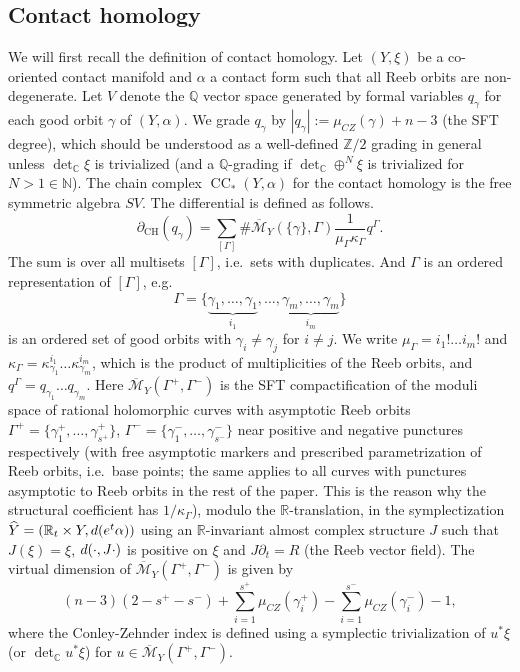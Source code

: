 \documentclass[reqno,11pt]{amsart}
\numberwithin{equation}{section}
\def\N{{\mathbb N}}
\def\R{\mathbb{R}}
\def\Z{{\mathbb Z}}
\def\C{{\mathbb C}}
\def\Q{{\mathbb Q}}
\def\cM{{\mathcal M}}
\def\rd{{\rm d}}
\DeclareMathOperator{\CH}{CH}
\DeclareMathOperator{\CC}{CC}
\begin{document}
\subsection{Contact homology}
We will first recall the definition of contact homology. Let $(Y,\xi)$ be a co-oriented contact manifold and $\alpha$ a contact form such that all Reeb orbits are non-degenerate. Let $V$ denote the $\Q$ vector space generated by formal variables $q_\gamma$ for each good orbit $\gamma$ of $(Y,\alpha)$. We grade $q_\gamma$ by $|q_{\gamma}|:=\mu_{CZ}(\gamma)+n-3$ (the SFT degree), which should be understood as a well-defined $\Z/2$ grading in general unless $\det_{\C}\xi$ is trivialized (and a $\Q$-grading if $\det_{\C}\oplus^N \xi$ is trivialized for $N>1\in \N$). The chain complex  $\CC_*(Y,\alpha)$ for the contact homology is the free symmetric algebra $SV$. The differential is defined as follows.
\begin{equation}\label{eqn:partial}
\partial_{\CH}(q_{\gamma}) = \sum_{[\Gamma]} \#\overline{\cM}_{Y}(\{\gamma \},\Gamma) \frac{1}{\mu_{\Gamma}\kappa_{\Gamma}}q^{\Gamma}.
\end{equation}
The sum is over all multisets $[\Gamma]$, i.e.\ sets with duplicates. And $\Gamma$ is an ordered representation of $[\Gamma]$, e.g.\ $$\Gamma=\{\underbrace{\gamma_1,\ldots,\gamma_1}_{i_1}, \ldots, \underbrace{\gamma_m,\ldots,\gamma_m}_{i_m}\}$$ is an ordered set of good orbits with $\gamma_i\ne \gamma_j$ for $i\ne j$. We write $\mu_{\Gamma}=i_1!\ldots i_m!$ and $\kappa_{\Gamma}=\kappa^{i_1}_{\gamma_1}\ldots \kappa^{i_m}_{\gamma_m}$, which is the product of multiplicities of the Reeb orbits, and $q^{\Gamma}=q_{\gamma_1} \ldots  q_{\gamma_m}$. Here $\overline{\cM}_{Y}(\Gamma^+,\Gamma^-)$ is the SFT compactification \cite{zbMATH02062477} of the moduli space of rational holomorphic curves with asymptotic Reeb orbits $\Gamma^+=\{\gamma_1^+,\ldots,\gamma_{s^+}^+ \}$, $\Gamma^-=\{\gamma_1^-,\ldots,\gamma_{s^-}^- \}$ near positive and negative punctures respectively (with free asymptotic markers and prescribed parametrization of Reeb orbits, i.e.\ base points; the same applies to all curves with punctures asymptotic to Reeb orbits in the rest of the paper. This is the reason why the structural coefficient has $1/\kappa_{\Gamma}$), modulo the $\R$-translation, in the symplectization $\widehat{Y}=(\R_t\times Y, \rd(e^t\alpha))$ using an $\R$-invariant almost complex structure $J$ such that $J(\xi)=\xi$, $\rd(\cdot, J\cdot)$ is positive on $\xi$ and $J\partial_t = R$ (the Reeb vector field). The virtual dimension of $\overline{\cM}_{Y}(\Gamma^+,\Gamma^-)$ is given by
$$(n-3)(2-s^+-s^-)+\sum_{i=1}^{s^+}\mu_{CZ}(\gamma_i^+) - \sum_{i=1}^{s^-}\mu_{CZ}(\gamma_i^-)-1,$$
where the Conley-Zehnder index is defined using a symplectic trivialization of $u^*\xi$ (or $\det_{\C}u^*\xi$) for $u\in \overline{\cM}_{Y}(\Gamma^+,\Gamma^-)$.
\end{document}
